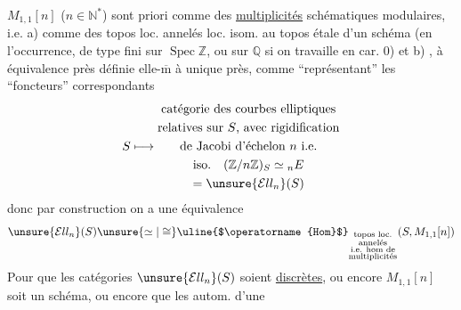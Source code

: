 $M_{1,1}[n]$ ($n\in\mathbb N^*$) sont   priori comme des \uline{multiplicités} schématiques modulaires, i.e. a) comme des topos loc. annelés loc. isom. au topos étale d'un schéma (en l'occurrence, de type fini sur $\operatorname{Spec}\mathbb Z$, ou sur $\mathbb Q$ si on travaille en car. 0) et b) , à équivalence près définie elle-$\overline{\mathrm m}$ à  unique près, comme ``représentant'' les  ``foncteurs'' correspondants
\[
S\longmapsto
\begin{gathered}
\text{catégorie des courbes elliptiques}\\
\text{relatives sur }S\text{, avec rigidification}\\
\text{de Jacobi d'échelon }n\text{ i.e.}\\
\text{iso.}\quad(\mathbb Z/n\mathbb Z)_S\simeq{}_nE\\
={}\unsure{\mathcal{E}ll_n}(S)
\end{gathered}
\]
donc par construction on a  une équivalence
\[
\unsure{\mathcal{E}ll_n}(S)\unsure{\simeq|\cong}
\text{\uline{$\operatorname{Hom}$}}_{\substack{\text{topos loc.}\\\text{annelés}\\\text{i.e. hom de}\\\text{multiplicités}}}
(S,M_{1,1}[n])
\]
Pour que les catégories $\unsure{\mathcal{E}ll_n}(S)$ soient \uline{discrètes},  ou encore $M_{1,1}[n]$ soit un schéma, ou encore que les autom. d'une


